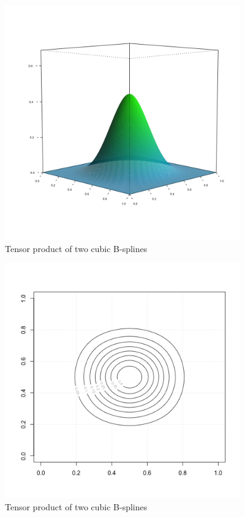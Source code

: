 \documentclass[12pt]{article}
\begin{document}
\begin{figure}[H]
  \centering
 \graphicspath{{img/}}
  \includegraphics[width=4in, height=4in]{bicubic_bspline.png}
  \caption{Tensor product of two cubic B-splines}\label{bicubic_bspline}
\end{figure}

\begin{figure}[H]
  \centering
  \graphicspath{{img/}}
  \includegraphics[width=4in, height=4in]{bicubic_bspline_contour.png}
  \caption{Tensor product of two cubic B-splines}\label{bicubic_bspline_contour}
\end{figure}


\end{document}
